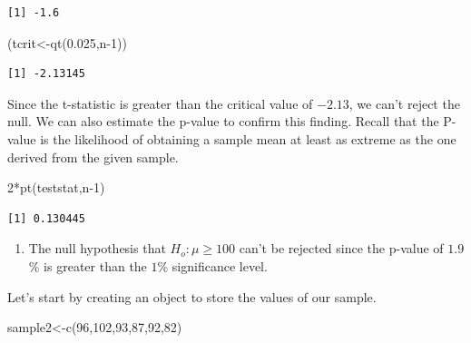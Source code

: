 \documentclass[
  letterpaper,
  DIV=11,
  numbers=noendperiod]{scrreprt}
\newenvironment{Shaded}{\begin{snugshade}}{\end{snugshade}}
\newcommand{\DecValTok}[1]{\textcolor[rgb]{0.68,0.00,0.00}{#1}}
\newcommand{\FloatTok}[1]{\textcolor[rgb]{0.68,0.00,0.00}{#1}}
\newcommand{\FunctionTok}[1]{\textcolor[rgb]{0.28,0.35,0.67}{#1}}
\newcommand{\NormalTok}[1]{\textcolor[rgb]{0.00,0.23,0.31}{#1}}
\newcommand{\OtherTok}[1]{\textcolor[rgb]{0.00,0.23,0.31}{#1}}
\newcommand{\SpecialCharTok}[1]{\textcolor[rgb]{0.37,0.37,0.37}{#1}}
\providecommand{\tightlist}{%
  \setlength{\itemsep}{0pt}\setlength{\parskip}{0pt}}\usepackage{longtable,booktabs,array}
\begin{document}
\begin{verbatim}
[1] -1.6
\end{verbatim}

\begin{Shaded}
\begin{Highlighting}[numbers=left,,]
\NormalTok{(tcrit}\OtherTok{\textless{}{-}}\FunctionTok{qt}\NormalTok{(}\FloatTok{0.025}\NormalTok{,n}\DecValTok{{-}1}\NormalTok{))}
\end{Highlighting}
\end{Shaded}

\begin{verbatim}
[1] -2.13145
\end{verbatim}

Since the t-statistic is greater than the critical value of \(-2.13\),
we can't reject the null. We can also estimate the p-value to confirm
this finding. Recall that the P-value is the likelihood of obtaining a
sample mean at least as extreme as the one derived from the given
sample.

\begin{Shaded}
\begin{Highlighting}[numbers=left,,]
\DecValTok{2}\SpecialCharTok{*}\FunctionTok{pt}\NormalTok{(teststat,n}\DecValTok{{-}1}\NormalTok{)}
\end{Highlighting}
\end{Shaded}

\begin{verbatim}
[1] 0.130445
\end{verbatim}

\begin{enumerate}
\def\labelenumi{\arabic{enumi}.}
\setcounter{enumi}{1}
\tightlist
\item
  The null hypothesis that \(H_{o}: \mu \geq 100\) can't be rejected
  since the p-value of \(1.9\)\% is greater than the \(1\)\%
  significance level.
\end{enumerate}

Let's start by creating an object to store the values of our sample.

\begin{Shaded}
\begin{Highlighting}[numbers=left,,]
\NormalTok{sample2}\OtherTok{\textless{}{-}}\FunctionTok{c}\NormalTok{(}\DecValTok{96}\NormalTok{,}\DecValTok{102}\NormalTok{,}\DecValTok{93}\NormalTok{,}\DecValTok{87}\NormalTok{,}\DecValTok{92}\NormalTok{,}\DecValTok{82}\NormalTok{)}
\end{Highlighting}
\end{Shaded}
\end{document}
